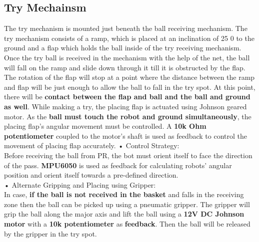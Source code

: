     \subsection{Try Mechainsm}
        The try mechanism is mounted just beneath the ball receiving mechanism. The try mechanism consists of a ramp, which is placed at an 
        inclination of 25 0 to the ground and a flap which holds the ball inside of the try receiving mechanism. Once the try ball is received 
        in the mechanism with the help of the net, the ball will fall on the ramp and slide down through it till it is obstructed by the flap. 
        The rotation of the flap will stop at a point where the distance between the ramp and flap will be just enough to allow the ball to fall 
        in the try spot. At this point, there will be \textbf{contact between the flap and ball and the ball and ground as well}. While making a try, the 
        placing flap is actuated using Johnson geared motor. As the \textbf{ball must touch the robot and ground simultaneously}, the placing flap’s angular 
        movement must be controlled. A \textbf{10k Ohm potentiometer} coupled to the motor’s shaft is used as feedback to control the movement of placing 
        flap accurately.
        • Control Strategy:\\
            Before receiving the ball from PR, the bot must orient itself to face the direction of the pass. \textbf{MPU6050} is
            used as feedback for calculating robots’ angular position and orient itself towards a pre-defined direction.\\
        •  Alternate Gripping and Placing using Gripper:\\
            In case, \textbf{if the ball is not received in the basket} and falls in the receiving zone then the ball can be picked up using a pneumatic
            gripper. The gripper will grip the ball along the major axis and lift the ball using a \textbf{12V DC Johnson motor} with a \textbf{10k potentiometer}
            as \textbf{feedback}. Then the ball will be released by the gripper in the try spot.




